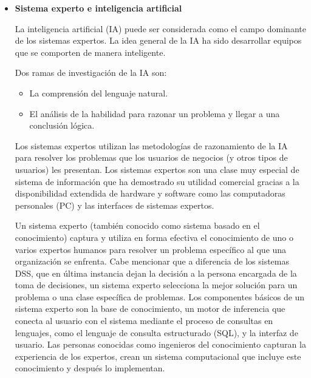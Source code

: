 \begin{itemize}
  \item \textbf{Sistema experto e inteligencia artificial }

        La inteligencia artificial (IA) puede ser considerada como el campo dominante
        de los sistemas expertos. La idea general de la IA ha sido desarrollar equipos
        que se comporten de manera inteligente\cite{kendall2005analisis}.

        Dos ramas de investigación de la IA son:

        \begin{itemize}

          \item La comprensión del lenguaje natural.
          \item El análisis de la habilidad para razonar un problema y llegar a una conclusión
                lógica.

        \end{itemize}

        Los sistemas expertos utilizan las metodologías de razonamiento de la IA para
        resolver los problemas que los usuarios de negocios (y otros tipos de usuarios)
        les presentan. Los sistemas expertos son una clase muy especial de sistema de
        información que ha demostrado su utilidad comercial gracias a la disponibilidad
        extendida de hardware y software como las computadoras personales (PC) y las
        interfaces de sistemas expertos.

        \vspace{1\baselineskip}
        Un sistema experto (también conocido como sistema basado en el conocimiento)
        captura y utiliza en forma efectiva el conocimiento de uno o varios expertos
        humanos para resolver un problema específico al que una organización se
        enfrenta. Cabe mencionar que a diferencia de los sistemas DSS, que en última
        instancia dejan la decisión a la persona encargada de la toma de decisiones, un
        sistema experto selecciona la mejor solución para un problema o una clase
        específica de problemas. Los componentes básicos de un sistema experto son la
        base de conocimiento, un motor de inferencia que conecta al usuario con el
        sistema mediante el proceso de consultas en lenguajes, como el lenguaje de
        consulta estructurado (SQL), y la interfaz de usuario. Las personas conocidas
        como ingenieros del conocimiento capturan la experiencia de los expertos, crean
        un sistema computacional que incluye este conocimiento y después lo
        implementan\cite{kendall2005analisis}.


\end{itemize}
